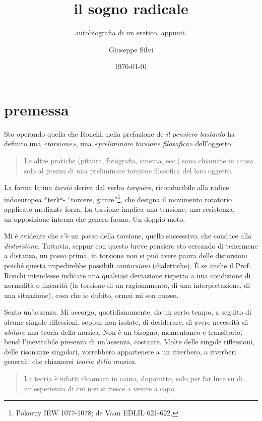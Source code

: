\documentclass{gs}
\title{il sogno radicale}
\subtitle{autobiografia di un eretico. appunti.}
\author{Giuseppe Silvi}
\date{\today}
\begin{document}
\maketitle

\section*{premessa}

Sto operando quella che Ronchi, nella prefazione de \emph{il pensiero bastardo} \cite{ronchi2001} ha definito una \emph{«torsione»}, una \emph{«preliminare torsione filosofica»} dell'oggetto.

\begin{quote}
Le altre pratiche (pittura, fotografia, cinema, ecc.) sono chiamate in causa solo al prezzo di una preliminare torsione filosofica del loro oggetto.
\end{quote}

La forma latina \textit{torsiō} deriva dal verbo \textit{torquēre}, riconducibile alla radice indoeuropea *terkʷ- “torcere, girare”\footnote{Pokorny IEW 1077-1078; de Vaan EDLIL 621-622.}, che designa il movimento rotatorio applicato mediante forza. La torsione implica una tensione, una resistenza, un'opposizione interna che genera forma. Un doppio moto. 

Mi è evidente che c'è un passo della torsione, quello successivo, che conduce alla \emph{distorsione}. %
Tuttavia, seppur con questo breve pensiero sto cercando di tenermene a distanza, un passo prima, in torsione non si può avere paura delle distorsioni poiché questa impedirebbe possibili \emph{contorsioni} (dialettiche). È se anche il Prof. Ronchi intendesse indicare una qualsiasi deviazione rispetto a una condizione di normalità o linearità (la torsione di un ragionamento, di una interpretazione, di una situazione), cosa che io dubito, ormai mi son mosso.

Sento un'assenza. Mi accorgo, quotidianamente, da un certo tempo, a seguito di alcune singole riflessioni, seppur non isolate, di desiderare, di avere necessità di \emph{abitare} una teoria della musica. Non è un bisogno, momentaneo e transitorio, bensì l'inevitabile presenza di un'assenza, costante. Molte delle singole riflessioni, delle risonanze singolari, vorrebbero appartenere a un riverbero, a riverberi generali: che chiamerei \emph{teoria della musica}. 

\begin{quote}
La teoria è infatti chiamata in causa, dopotutto, solo per far luce su di un'esperienza di cui non si riesce a venire a capo. 
\end{quote}
\end{document}
